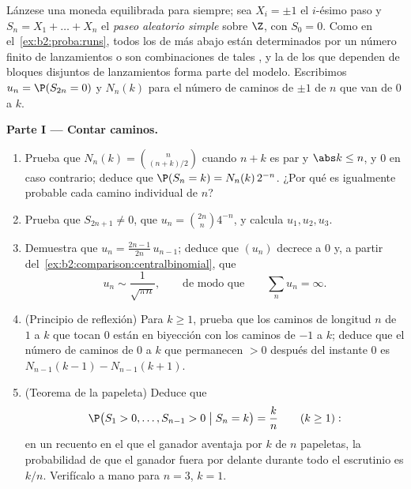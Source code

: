\begin{problem}\label{pb:b2:proba:1}
Lánzese una moneda equilibrada para siempre; sea $X_i = \pm1$ el
$i$-ésimo paso y $S_n = X_1 + \dots + X_n$ el \emph{paseo aleatorio
simple} sobre $\Z$, con $S_0 = 0$. Como en el~\cref{ex:b2:proba:runs}, todos los  de más abajo están
determinados por un número finito de lanzamientos o son
combinaciones  de tales , y la  de
los  que dependen de bloques disjuntos de lanzamientos forma
parte del modelo. Escribimos $u_n = \P(S_{2n} = 0)$ y $N_n(k)$ para
el número de caminos de $\pm1$ de  $n$ que van de $0$ a $k$.

\medskip
\noindent\textbf{Parte I --- Contar caminos.}
\begin{enumerate}
  \item Prueba que $N_n(k) = \binom{n}{(n+k)/2}$ cuando $n + k$ es
        par y $\abs k \leq n$, y $0$ en caso contrario; deduce que
        $\P(S_n = k) = N_n(k)\,2^{-n}$. ¿Por qué es igualmente
        probable cada camino individual de  $n$?
  \item Prueba que $S_{2n+1} \neq 0$, que $u_n =
        \binom{2n}{n}4^{-n}$, y calcula $u_1, u_2, u_3$.
  \item Demuestra que $u_n = \frac{2n-1}{2n}\,u_{n-1}$; deduce que
        $(u_n)$ decrece a $0$ y, a partir del~\cref{ex:b2:comparison:centralbinomial}, que
        \[
        u_n \sim \frac{1}{\sqrt{\pi n}},
        \qquad\text{de modo que}\qquad
        \sum_n u_n = \infty .
        \]
  \item (Principio de reflexión) Para $k \geq 1$, prueba que los
        caminos de longitud $n$ de $1$ a $k$ que tocan $0$ están en
        biyección con los caminos de $-1$ a $k$; deduce que el
        número de caminos de $0$ a $k$ que permanecen $> 0$ después
        del instante $0$ es $N_{n-1}(k-1) - N_{n-1}(k+1)$.
  \item (Teorema de la papeleta) Deduce que
        \[
        \P\bigl(S_1 > 0, \dots, S_{n-1} > 0 \bigm| S_n =
        k\bigr) = \frac kn \qquad (k \geq 1) :
        \]
        en un recuento en el que el ganador aventaja por $k$ de $n$
        papeletas, la probabilidad de que el ganador fuera por
        delante durante todo el escrutinio es $k/n$. Verifícalo a
        mano para $n = 3$, $k = 1$.
\end{enumerate}


\end{problem}
